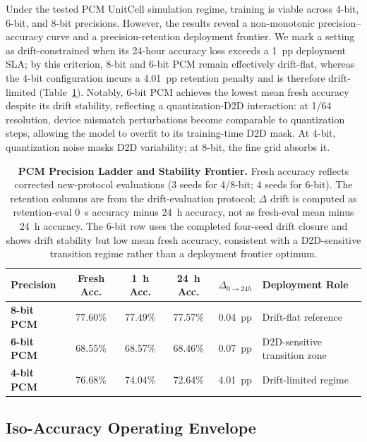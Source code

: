 Under the tested PCM UnitCell simulation regime, training is viable across 4-bit, 6-bit, and 8-bit precisions. However, the results reveal a non-monotonic precision--accuracy curve and a precision-retention deployment frontier. We mark a setting as drift-constrained when its 24-hour accuracy loss exceeds a 1~pp deployment SLA; by this criterion, 8-bit and 6-bit PCM remain effectively drift-flat, whereas the 4-bit configuration incurs a 4.01~pp retention penalty and is therefore drift-limited (Table~\ref{tab:pcm_precision_ladder}). Notably, 6-bit PCM achieves the lowest mean fresh accuracy despite its drift stability, reflecting a quantization-D2D interaction: at 1/64 resolution, device mismatch perturbations become comparable to quantization steps, allowing the model to overfit to its training-time D2D mask. At 4-bit, quantization noise masks D2D variability; at 8-bit, the fine grid absorbs it.

\begin{table}[htbp]
\centering
\caption{\textbf{PCM Precision Ladder and Stability Frontier.} Fresh accuracy reflects corrected new-protocol evaluations (3 seeds for 4/8-bit; 4 seeds for 6-bit). The retention columns are from the drift-evaluation protocol; $\Delta$ drift is computed as retention-eval 0~s accuracy minus 24~h accuracy, not as fresh-eval mean minus 24~h accuracy. The 6-bit row uses the completed four-seed drift closure and shows drift stability but low mean fresh accuracy, consistent with a D2D-sensitive transition regime rather than a deployment frontier optimum.}
\label{tab:pcm_precision_ladder}
\begin{tabular}{lcccll}
\toprule
\textbf{Precision} & \textbf{Fresh Acc.} & \textbf{1~h Acc.} & \textbf{24~h Acc.} & \textbf{$\Delta_{0\rightarrow24h}$} & \textbf{Deployment Role} \\
\midrule
\textbf{8-bit PCM} & 77.60\% & 77.49\% & 77.57\% & 0.04~pp & Drift-flat reference \\
\textbf{6-bit PCM} & 68.55\% & 68.57\% & 68.46\% & 0.07~pp & D2D-sensitive transition zone \\
\textbf{4-bit PCM} & 76.68\% & 74.04\% & 72.64\% & 4.01~pp & Drift-limited regime \\
\bottomrule
\end{tabular}
\end{table}

\subsection{Iso-Accuracy Operating Envelope}
\label{subsec:iso-accuracy}

